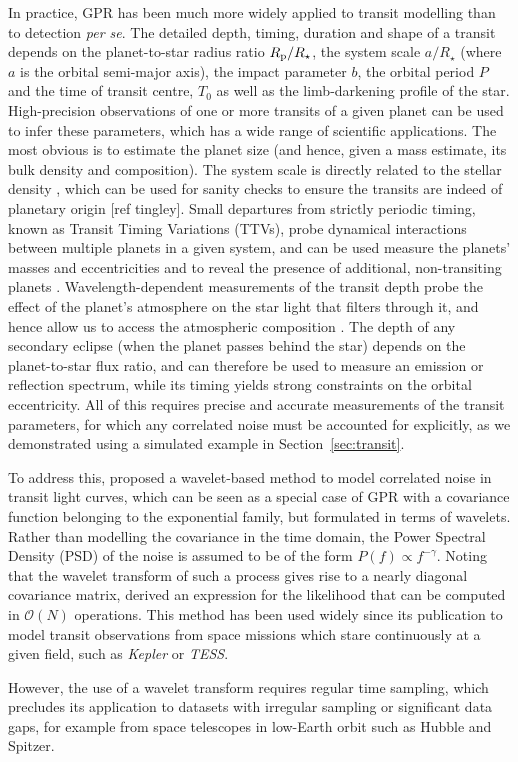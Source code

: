 \documentclass[letterpaper]{ar-1col}
\begin{document}
In practice, GPR has been much more widely applied to transit modelling than to detection \textit{per se}. The detailed depth, timing, duration and shape of a transit depends on the planet-to-star radius ratio $R_{\rm p}/R_\star$, the system scale $a/R_\star$ (where $a$ is the orbital semi-major axis), the impact parameter $b$, the orbital period $P$ and the time of transit centre, $T_0$ as well as the limb-darkening profile of the star. High-precision observations of one or more transits of a given planet can be used to infer these parameters, which has a wide range of scientific applications. The most obvious is to estimate the planet size (and hence, given a mass estimate, its bulk density and composition). The system scale is directly related to the stellar density \citep{2003ApJ...585.1038S}, which can be used for sanity checks to ensure the transits are indeed of planetary origin [ref tingley]. Small departures from strictly periodic timing, known as Transit Timing Variations (TTVs), probe dynamical interactions between multiple planets in a given system, and can be used measure the planets' masses and eccentricities and to reveal the presence of additional, non-transiting planets \citep{2005Sci...307.1288H}. Wavelength-dependent measurements of the transit depth probe the effect of the planet's atmosphere on the star light that filters through it, and hence allow us to access the atmospheric composition \citep{2000ApJ...537..916S}. The depth of any secondary eclipse (when the planet passes behind the star) depends on the planet-to-star flux ratio, and can therefore be used to measure an emission or reflection spectrum, while its timing yields strong constraints on the orbital eccentricity. All of this requires precise and accurate measurements of the transit parameters, for which any correlated noise must be accounted for explicitly, as we demonstrated using a simulated example in Section~\ref{sec:transit}.


To address this, \citet{2009ApJ...704...51C} proposed a wavelet-based method to model correlated noise in transit light curves, which can be seen as a special case of GPR with a covariance function belonging to the exponential family, but formulated in terms of wavelets. Rather than modelling the covariance in the time domain, the Power Spectral Density (PSD) of the noise is assumed to be of the form $P(f) \propto f^{-\gamma}$.
Noting that the wavelet transform of such a process gives rise to a nearly diagonal covariance matrix, \citet{2009ApJ...704...51C}  derived an expression for the likelihood that can be computed in $\mathcal{O}(N)$ operations. 
This method has been used widely since its publication to model transit observations from space missions which stare continuously at a given field, such as \textit{Kepler} or \textit{TESS}. \begin{armarginnote}
\end{armarginnote}
However, the use of a wavelet transform requires regular time sampling, which precludes its application to datasets with irregular sampling or significant data gaps, for example from space telescopes in low-Earth orbit such as Hubble and Spitzer.
\end{document}
